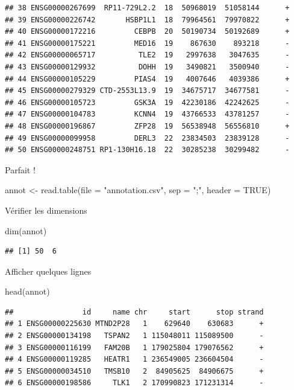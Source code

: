 \documentclass[
]{book}
\newenvironment{Shaded}{\begin{snugshade}}{\end{snugshade}}
\newcommand{\AttributeTok}[1]{\textcolor[rgb]{0.77,0.63,0.00}{#1}}
\newcommand{\ConstantTok}[1]{\textcolor[rgb]{0.00,0.00,0.00}{#1}}
\newcommand{\FunctionTok}[1]{\textcolor[rgb]{0.00,0.00,0.00}{#1}}
\newcommand{\NormalTok}[1]{#1}
\newcommand{\OtherTok}[1]{\textcolor[rgb]{0.56,0.35,0.01}{#1}}
\newcommand{\StringTok}[1]{\textcolor[rgb]{0.31,0.60,0.02}{#1}}
\begin{document}
\begin{verbatim}
## 38 ENSG00000267699  RP11-729L2.2  18  50968019  51058144      +
## 39 ENSG00000226742       HSBP1L1  18  79964561  79970822      +
## 40 ENSG00000172216         CEBPB  20  50190734  50192689      +
## 41 ENSG00000175221         MED16  19    867630    893218      -
## 42 ENSG00000065717          TLE2  19   2997638   3047635      -
## 43 ENSG00000129932          DOHH  19   3490821   3500940      -
## 44 ENSG00000105229         PIAS4  19   4007646   4039386      +
## 45 ENSG00000279329 CTD-2553L13.9  19  34675717  34677581      -
## 46 ENSG00000105723         GSK3A  19  42230186  42242625      -
## 47 ENSG00000104783         KCNN4  19  43766533  43781257      -
## 48 ENSG00000196867         ZFP28  19  56538948  56556810      +
## 49 ENSG00000099958         DERL3  22  23834503  23839128      -
## 50 ENSG00000248751 RP1-130H16.18  22  30285238  30299482      -
\end{verbatim}

Parfait !

\begin{Shaded}
\begin{Highlighting}[]
\NormalTok{annot }\OtherTok{\textless{}{-}} \FunctionTok{read.table}\NormalTok{(}\AttributeTok{file =} \StringTok{"annotation.csv"}\NormalTok{, }\AttributeTok{sep =} \StringTok{";"}\NormalTok{, }\AttributeTok{header =} \ConstantTok{TRUE}\NormalTok{)}
\end{Highlighting}
\end{Shaded}

Vérifier les dimensions

\begin{Shaded}
\begin{Highlighting}[]
\FunctionTok{dim}\NormalTok{(annot)  }
\end{Highlighting}
\end{Shaded}

\begin{verbatim}
## [1] 50  6
\end{verbatim}

Afficher quelques lignes

\begin{Shaded}
\begin{Highlighting}[]
\FunctionTok{head}\NormalTok{(annot)}
\end{Highlighting}
\end{Shaded}

\begin{verbatim}
##                id     name chr     start      stop strand
## 1 ENSG00000225630 MTND2P28   1    629640    630683      +
## 2 ENSG00000134198   TSPAN2   1 115048011 115089500      -
## 3 ENSG00000116199   FAM20B   1 179025804 179076562      +
## 4 ENSG00000119285   HEATR1   1 236549005 236604504      -
## 5 ENSG00000034510   TMSB10   2  84905625  84906675      +
## 6 ENSG00000198586     TLK1   2 170990823 171231314      -
\end{verbatim}
\end{document}
